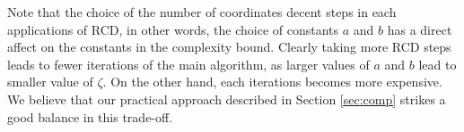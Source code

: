 \documentclass[11pt]{article}
\numberwithin{equation}{section}
\begin{document}
    \begin{remark}
    Note that the choice of the number of coordinates decent steps in each applications of RCD, in other words, the choice of constants $a$ and $b$ has a direct affect on the constants in  the complexity bound.  Clearly taking more RCD steps leads to fewer iterations of the main algorithm, as larger values of $a$ and $b$ lead to smaller value of $\zeta$.  On the other hand, each iterations becomes more expensive. We believe that our 
    practical approach described in Section \ref{sec:comp} strikes a good balance in this trade-off.  \end{remark} 


\end{document}
